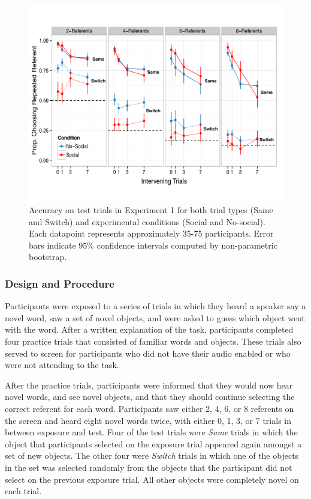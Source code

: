 \documentclass[10pt,letterpaper]{article}
\begin{document}
\begin{figure}[t!]
\begin{center}
\includegraphics[scale=0.5]{plots_figs/acc-test-expt1}
\end{center}
\caption{Accuracy on test trials in Experiment 1 for both trial types (Same and Switch) and 
experimental conditions (Social and No-social). Each datapoint represents 
approximately 35-75 participants. Error bars indicate 95\% confidence intervals 
computed by non-parametric bootstrap.}
\end{figure}

\subsubsection{Design and Procedure}

Participants were exposed to a series of trials in which they heard a speaker say a novel word, 
saw a set of novel objects, and were asked to guess which object went with the word. 
After a written explanation of the task, participants completed four practice trials that consisted of 
familiar words and objects. These trials also served to screen for participants
who did not have their audio enabled or who were not attending to the task.

After the practice trials, participants were informed that they would now hear
novel words, and see novel objects, and that they should continue selecting the correct
referent for each word. Participants saw either 2, 4, 6, or 8 referents on
the screen and heard eight novel words twice, with either 0, 1, 3, or 7 trials in between exposure and test. Four of the test trials were \textit{Same} trials in which the object that participants selected on the exposure trial appeared again amongst a set of new objects. 
The other four were \textit{Switch} trials in which one of the objects in the set was selected 
randomly from the objects that the participant did not select on the previous exposure trial. 
All other objects were completely novel on each trial. 
\end{document}
